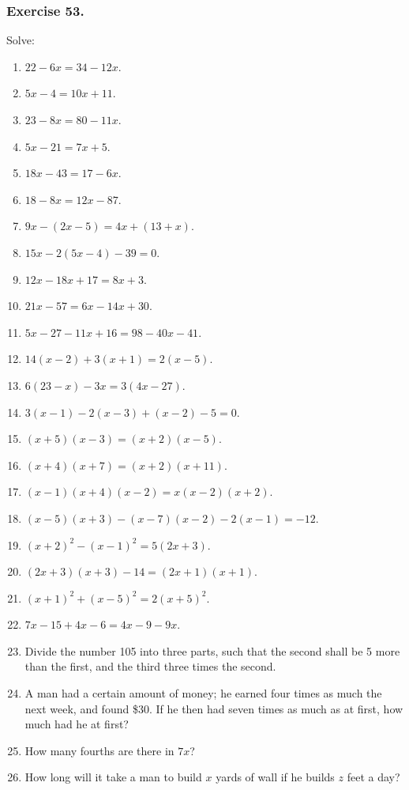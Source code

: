 \documentclass{book}
\begin{document}
\subsubsection*{Exercise 53.}

Solve:

\begin{enumerate}
\item $22-6x=34-12x$.
\item $5x-4=10x+ 11$.
\item $23-8x=80-11x$.
\item $5x-21=7x + 5$.
\item $18x-43=17-6x$.
\item $18-8x=12x- 87$.
\item $9x-(2x-5)=4x+(13 + x)$.
\item $15x-2(5x-4)-39 = 0$.
\item $12x-18x+17=8x+3$.
\item $21x-57=6x-14x+30$.
\item $5x-27-11x+16=98-40x-41$.
\item $14(x-2)+3(x+1)= 2(x-5)$.
\item $6(23-x)-3x=3(4x-27)$.
\item $3(x-1)-2(x-3)+(x-2)-5=0$.
\item $(x+5)(x-3)=(x+2)(x-5)$.
\item $(x+4)(x+7)=(x+2)(x+11)$.
\item $(x-1)(x+4)(x-2)=x(x-2)(x+2)$.
\item $(x-5)(x+3)-(x-7)(x-2)-2(x-1)=-12$.
\item $(x+2)^{2}-(x-1)^{2}=5(2x+3)$.
\item $(2x+3)(x+3)-14=(2x+1)(x+1)$.
\item $(x+1)^{2}+(x-5)^{2}=2(x+5)^{2}$.

\item $7x - 15 + 4x - 6 = 4x - 9 - 9x$.

\item Divide the number 105 into three parts, such that the second
shall be 5 more than the first, and the third three times the
second.

\item A man had a certain amount of money; he earned four times as
much the next week, and found \$30. If he then had seven times as
much as at first, how much had he at first?

\item How many fourths are there in $7x$?

\item How long will it take a man to build $x$ yards of wall if he
builds $z$ feet a day?


\end{enumerate}
\end{document}
